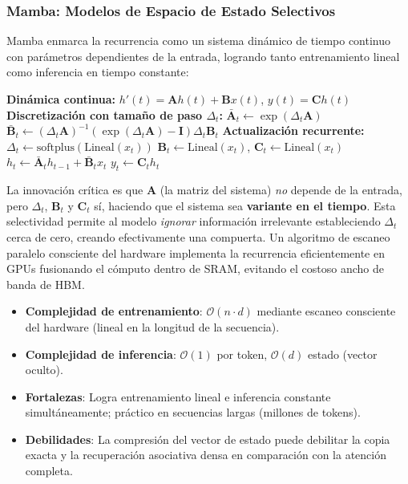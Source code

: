 \documentclass[11pt,a4paper]{article}
\begin{document}
\subsubsection{Mamba: Modelos de Espacio de Estado Selectivos}
Mamba \citep{gu_mamba_2023} enmarca la recurrencia como un sistema dinámico de tiempo continuo con parámetros dependientes de la entrada, logrando tanto entrenamiento lineal como inferencia en tiempo constante:

\begin{algorithmic}[1]
\State \textbf{Dinámica continua:} $h'(t) = \mathbf{A} h(t) + \mathbf{B} x(t)$, \quad $y(t) = \mathbf{C} h(t)$
\State \textbf{Discretización con tamaño de paso $\Delta_t$:}
\State $\bar{\mathbf{A}}_t \gets \exp(\Delta_t \mathbf{A})$
\State $\bar{\mathbf{B}}_t \gets (\Delta_t \mathbf{A})^{-1} (\exp(\Delta_t \mathbf{A}) - \mathbf{I}) \Delta_t \mathbf{B}_t$
\State \textbf{Actualización recurrente:}
    \State $\Delta_t \gets \text{softplus}(\text{Lineal}(x_t))$ 
    \State $\mathbf{B}_t \gets \text{Lineal}(x_t)$, \quad $\mathbf{C}_t \gets \text{Lineal}(x_t)$ 
    \State $h_t \gets \bar{\mathbf{A}}_t h_{t-1} + \bar{\mathbf{B}}_t x_t$ 
    \State $y_t \gets \mathbf{C}_t h_t$ 
\EndFor
\end{algorithmic}

La innovación crítica es que $\mathbf{A}$ (la matriz del sistema) \textit{no} depende de la entrada, pero $\Delta_t$, $\mathbf{B}_t$ y $\mathbf{C}_t$ sí, haciendo que el sistema sea \textbf{variante en el tiempo}. Esta selectividad permite al modelo \textit{ignorar} información irrelevante estableciendo $\Delta_t$ cerca de cero, creando efectivamente una compuerta. Un algoritmo de escaneo paralelo consciente del hardware implementa la recurrencia eficientemente en GPUs fusionando el cómputo dentro de SRAM, evitando el costoso ancho de banda de HBM.

\begin{itemize}[leftmargin=*]
    \item \textbf{Complejidad de entrenamiento}: $\mathcal{O}(n \cdot d)$ mediante escaneo consciente del hardware (lineal en la longitud de la secuencia).
    \item \textbf{Complejidad de inferencia}: $\mathcal{O}(1)$ por token, $\mathcal{O}(d)$ estado (vector oculto).
    \item \textbf{Fortalezas}: Logra entrenamiento lineal e inferencia constante simultáneamente; práctico en secuencias largas (millones de tokens).
    \item \textbf{Debilidades}: La compresión del vector de estado puede debilitar la copia exacta y la recuperación asociativa densa en comparación con la atención completa.
\end{itemize}
\end{document}
